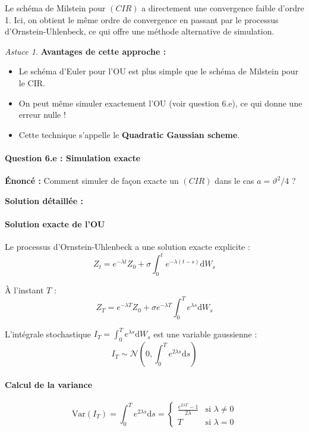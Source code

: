 \documentclass[12pt,a4paper]{article}
\theoremstyle{definition}
\theoremstyle{remark}
\newtheorem*{astuce}{Astuce}
\newcommand{\Var}{\text{Var}}
\newcommand{\dd}{\mathrm{d}}
\begin{document}
Le schéma de Milstein pour $(CIR)$ a directement une convergence faible d'ordre 1. Ici, on obtient le même ordre de convergence en passant par le processus d'Ornstein-Uhlenbeck, ce qui offre une méthode alternative de simulation.

\begin{astuce}
\textbf{Avantages de cette approche :}
\begin{itemize}
\item Le schéma d'Euler pour l'OU est plus simple que le schéma de Milstein pour le CIR.
\item On peut même simuler exactement l'OU (voir question 6.e), ce qui donne une erreur nulle !
\item Cette technique s'appelle le \textbf{Quadratic Gaussian scheme}.
\end{itemize}
\end{astuce}

\paragraph{Question 6.e : Simulation exacte}

\textbf{Énoncé :} Comment simuler de façon exacte un $(CIR)$ dans le cas $a = \vartheta^2/4$ ?

\textbf{Solution détaillée :}

\paragraph{Solution exacte de l'OU}

Le processus d'Ornstein-Uhlenbeck a une solution exacte explicite :
\[
Z_t = e^{-\lambda t}Z_0 + \sigma\int_0^t e^{-\lambda(t-s)}\dd W_s
\]

À l'instant $T$ :
\[
Z_T = e^{-\lambda T}Z_0 + \sigma e^{-\lambda T}\int_0^T e^{\lambda s}\dd W_s
\]

L'intégrale stochastique $I_T = \int_0^T e^{\lambda s}\dd W_s$ est une variable gaussienne :
\[
I_T \sim \mathcal{N}\left(0, \int_0^T e^{2\lambda s}\dd s\right)
\]

\paragraph{Calcul de la variance}

\[
\Var(I_T) = \int_0^T e^{2\lambda s}\dd s = \begin{cases}
\frac{e^{2\lambda T} - 1}{2\lambda} & \text{si } \lambda \neq 0 \\
T & \text{si } \lambda = 0
\end{cases}
\]
\end{document}
